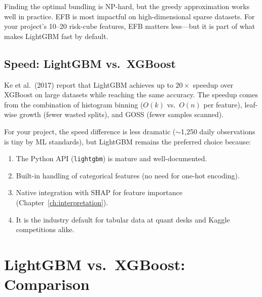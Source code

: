 Finding the optimal bundling is NP-hard, but the greedy approximation works well in practice.
EFB is most impactful on high-dimensional sparse datasets.
For your project's 10--20 risk-cube features, EFB matters less---but it is part of what makes LightGBM fast by default.

\subsection{Speed: LightGBM vs.\ XGBoost}

Ke et al.\ (2017) report that LightGBM achieves up to $20\times$ speedup over XGBoost on large datasets while reaching the same accuracy.
The speedup comes from the combination of histogram binning ($O(k)$ vs.\ $O(n)$ per feature), leaf-wise growth (fewer wasted splits), and GOSS (fewer samples scanned).

For your project, the speed difference is less dramatic ($\sim$1,250 daily observations is tiny by ML standards), but LightGBM remains the preferred choice because:
\begin{enumerate}[nosep]
  \item The Python API (\texttt{lightgbm}) is mature and well-documented.
  \item Built-in handling of categorical features (no need for one-hot encoding).
  \item Native integration with SHAP for feature importance (Chapter~\ref{ch:interpretation}).
  \item It is the industry default for tabular data at quant desks and Kaggle competitions alike.
\end{enumerate}

\section{LightGBM vs.\ XGBoost: Comparison}
\label{sec:lgb-vs-xgb}

